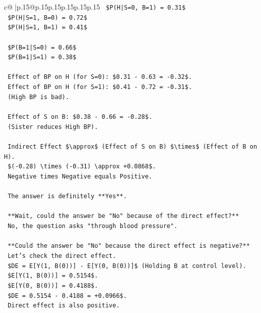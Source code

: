 \documentclass{article}
\begin{document}
{\begin{supertabular}{c@{$\;$}|p{.15\linewidth}@{}p{.15\linewidth}p{.15\linewidth}p{.15\linewidth}p{.15\linewidth}p{.15\linewidth}}
{{{\texttt{    \$P(H|S=0, B=1) = 0.31\$} \\
\texttt{    \$P(H|S=1, B=0) = 0.72\$} \\
\texttt{    \$P(H|S=1, B=1) = 0.41\$} \\
\\ 
\texttt{    \$P(B=1|S=0) = 0.66\$} \\
\texttt{    \$P(B=1|S=1) = 0.38\$} \\
\\ 
\texttt{    Effect of BP on H (for S=0): \$0.31 {-} 0.63 = {-}0.32\$.} \\
\texttt{    Effect of BP on H (for S=1): \$0.41 {-} 0.72 = {-}0.31\$.} \\
\texttt{    (High BP is bad).} \\
\\ 
\texttt{    Effect of S on B: \$0.38 {-} 0.66 = {-}0.28\$.} \\
\texttt{    (Sister reduces High BP).} \\
\\ 
\texttt{    Indirect Effect \$\textbackslash{}approx\$ (Effect of S on B) \$\textbackslash{}times\$ (Effect of B on H).} \\
\texttt{    \$({-}0.28) \textbackslash{}times ({-}0.31) \textbackslash{}approx +0.0868\$.} \\
\texttt{    Negative times Negative equals Positive.} \\
\\ 
\texttt{    The answer is definitely **Yes**.} \\
\\ 
\texttt{    **Wait, could the answer be "No" because of the direct effect?**} \\
\texttt{    No, the question asks "through blood pressure".} \\
\\ 
\texttt{    **Could the answer be "No" because the direct effect is negative?**} \\
\texttt{    Let's check the direct effect.} \\
\texttt{    \$DE = E{[}Y(1, B(0)){]} {-} E{[}Y(0, B(0)){]}\$ (Holding B at control level).} \\
\texttt{    \$E{[}Y(1, B(0)){]} = 0.5154\$.} \\
\texttt{    \$E{[}Y(0, B(0)){]} = 0.4188\$.} \\
\texttt{    \$DE = 0.5154 {-} 0.4188 = +0.0966\$.} \\
\texttt{    Direct effect is also positive.} \\
}}}
\end{supertabular}}
\end{document}
